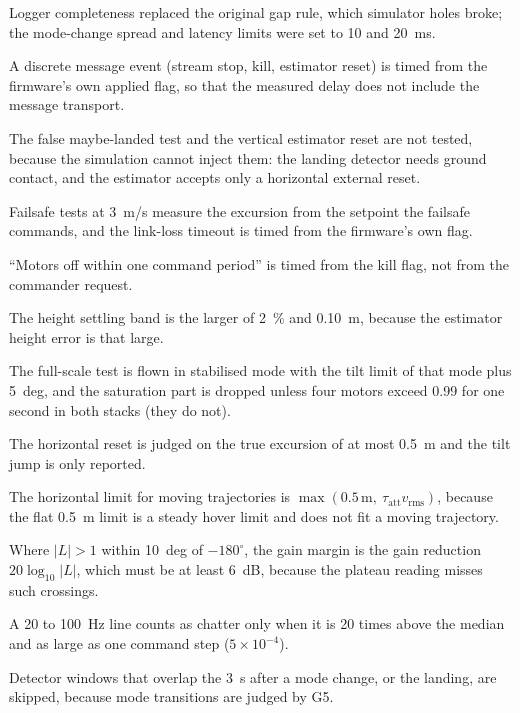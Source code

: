\begin{description}[leftmargin=1.4em,labelindent=0pt]
  \item[G1.1] Logger completeness replaced the original gap rule, which simulator holes broke; the mode-change spread and latency limits were set to 10 and 20~ms.
  \item[G1.5, G5 events] A discrete message event (stream stop, kill, estimator reset) is timed from the firmware's own applied flag, so that the measured delay does not include the message transport.
  \item[G5.6, G5.11] The false maybe-landed test and the vertical estimator reset are not tested, because the simulation cannot inject them: the landing detector needs ground contact, and the estimator accepts only a horizontal external reset.
  \item[G5.8] Failsafe tests at 3~m/s measure the excursion from the setpoint the failsafe commands, and the link-loss timeout is timed from the firmware's own flag.
  \item[G5.9] ``Motors off within one command period'' is timed from the kill flag, not from the commander request.
  \item[G5.2] The height settling band is the larger of 2~\% and 0.10~m, because the estimator height error is that large.
  \item[G5.10] The full-scale test is flown in stabilised mode with the tilt limit of that mode plus 5~deg, and the saturation part is dropped unless four motors exceed 0.99 for one second in both stacks (they do not).
  \item[G5.11] The horizontal reset is judged on the true excursion of at most 0.5~m and the tilt jump is only reported.
  \item[G5.5] The horizontal limit for moving trajectories is $\max(0.5\,\mathrm{m},\ \tau_\mathrm{att}v_\mathrm{rms})$, because the flat 0.5~m limit is a steady hover limit and does not fit a moving trajectory.
  \item[G2] Where $|L|>1$ within 10~deg of $-180^\circ$, the gain margin is the gain reduction $20\log_{10}|L|$, which must be at least 6~dB, because the plateau reading misses such crossings.
  \item[G4 chatter] A 20 to 100~Hz line counts as chatter only when it is 20 times above the median and as large as one command step ($5\times 10^{-4}$).
  \item[G4 and G3 windows] Detector windows that overlap the 3~s after a mode change, or the landing, are skipped, because mode transitions are judged by G5.

\end{description}
